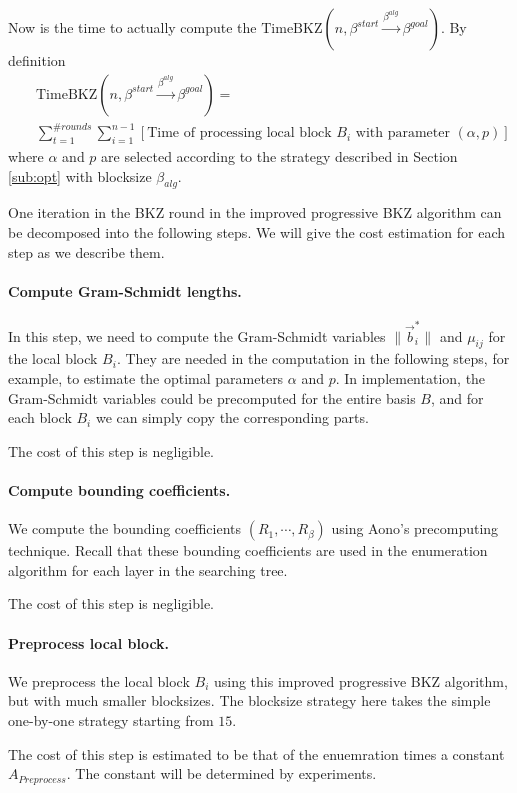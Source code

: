 \documentclass[11pt]{article}
\newcommand{\vb}{\vec{b}}
\newcommand{\TimeBKZ}{\mathrm{TimeBKZ}}
\begin{document}
Now is the time to actually compute the $\TimeBKZ(n,\beta^{start}\xrightarrow{\beta^{alg}}\beta^{goal})$.
By definition
\begin{eqnarray}
&&\TimeBKZ(n,\beta^{start}\xrightarrow{\beta^{alg}}\beta^{goal})=\nonumber\\
&&\sum_{t=1}^{\#rounds}\sum_{i=1}^{n-1}\left[\text{Time of processing local block $B_i$ with parameter $(\alpha,p)$}\right]
\end{eqnarray}
where $\alpha$ and $p$ are selected according to the strategy described in Section \ref{sub:opt} with blocksize $\beta_{alg}$.

One iteration in the BKZ round in the improved progressive BKZ algorithm can be decomposed into the following steps.
We will give the cost estimation for each step as we describe them.

\paragraph{Compute Gram-Schmidt lengths.}
In this step, we need to compute the Gram-Schmidt variables $\|\vb_i^*\|$ and $\mu_{ij}$ for the local block $B_i$. They are needed in the computation in the following steps, for example, to estimate the optimal parameters $\alpha$ and $p$.
In implementation, the Gram-Schmidt variables could be precomputed for the entire basis $B$, and for each block $B_i$ we can simply copy the corresponding parts.

The cost of this step is negligible.

\paragraph{Compute bounding coefficients.}
We compute the bounding coefficients $(R_1,\cdots,R_{\beta})$ using Aono's precomputing technique.
Recall that these bounding coefficients are used in the enumeration algorithm for each layer in the searching tree.

The cost of this step is negligible.

\paragraph{Preprocess local block.}
We preprocess the local block $B_i$ using this improved progressive BKZ algorithm, but with much smaller blocksizes.
The blocksize strategy here takes the simple one-by-one strategy starting from $15$.

The cost of this step is estimated to be that of the enuemration times a constant $A_{Preprocess}$.
The constant will be determined by experiments.
\end{document}
